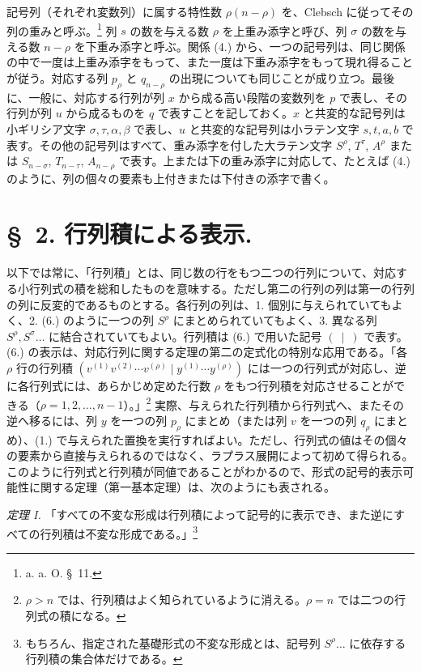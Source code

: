 \documentclass[11pt]{jlreq}
\begin{document}
記号列（それぞれ変数列）に属する特性数 $\rho(n-\rho)$ を、Clebsch に従ってその列の重みと呼ぶ。\footnote{a. a. O. \S\ 11.} 列 $s$ の数を与える数 $\rho$ を上重み添字と呼び、列 $\sigma$ の数を与える数 $n-\rho$ を下重み添字と呼ぶ。関係 (4.) から、一つの記号列は、同じ関係の中で一度は上重み添字をもって、また一度は下重み添字をもって現れ得ることが従う。対応する列 $p_\rho$ と $q_{n-\rho}$ の出現についても同じことが成り立つ。最後に、一般に、対応する行列が列 $x$ から成る高い段階の変数列を $p$ で表し、その行列が列 $u$ から成るものを $q$ で表すことを記しておく。$x$ と共変的な記号列は小ギリシア文字 $\sigma,\tau,\alpha,\beta$ で表し、$u$ と共変的な記号列は小ラテン文字 $s,t,a,b$ で表す。その他の記号列はすべて、重み添字を付した大ラテン文字 $S^\rho$, $T^\tau$, $A^\rho$ または $S_{n-\sigma}$, $T_{n-\tau}$, $A_{n-\rho}$ で表す。上または下の重み添字に対応して、たとえば (4.) のように、列の個々の要素も上付きまたは下付きの添字で書く。
\clearpage
\section*{\S\ 2. 行列積による表示.}
以下では常に、「行列積」とは、同じ数の行をもつ二つの行列について、対応する小行列式の積を総和したものを意味する。ただし第二の行列の列は第一の行列の列に反変的であるものとする。各行列の列は、1. 個別に与えられていてもよく、2. (6.) のように一つの列 $S^\rho$ にまとめられていてもよく、3. 異なる列 $S^\rho,S^\sigma\ldots$ に結合されていてもよい。行列積は (6.) で用いた記号 $(\ \mid\ )$ で表す。(6.) の表示は、対応行列に関する定理の第二の定式化の特別な応用である。「各 $\rho$ 行の行列積 $(v^{(1)}v^{(2)}\cdots v^{(\rho)}\mid y^{(1)}\cdots y^{(\rho)})$ には一つの行列式が対応し、逆に各行列式には、あらかじめ定めた行数 $\rho$ をもつ行列積を対応させることができる（$\rho=1,2,\ldots,n-1$）。」\footnote{$\rho>n$ では、行列積はよく知られているように消える。$\rho=n$ では二つの行列式の積になる。} 実際、与えられた行列積から行列式へ、またその逆へ移るには、列 $y$ を一つの列 $p_\rho$ にまとめ（または列 $v$ を一つの列 $q_\rho$ にまとめ）、(1.) で与えられた置換を実行すればよい。ただし、行列式の値はその個々の要素から直接与えられるのではなく、ラプラス展開によって初めて得られる。このように行列式と行列積が同値であることがわかるので、形式の記号的表示可能性に関する定理（第一基本定理）は、次のようにも表される。

\emph{定理 I.} 「すべての不変な形成は行列積によって記号的に表示でき、また逆にすべての行列積は不変な形成である。」\footnote{もちろん、指定された基礎形式の不変な形成とは、記号列 $S^\rho\ldots$ に依存する行列積の集合体だけである。}
\end{document}
